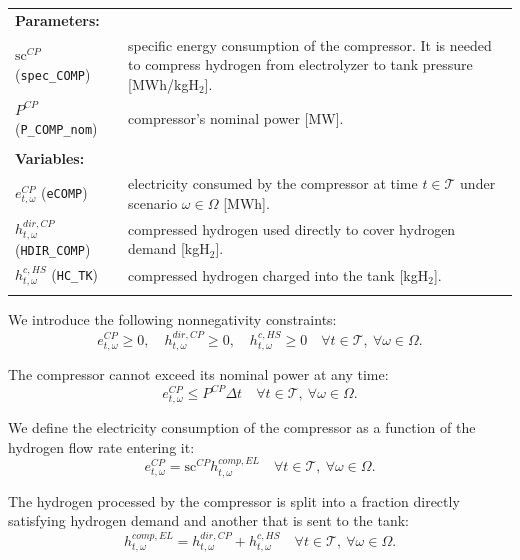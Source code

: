 \documentclass{article}
\begin{document}
\noindent
\begin{tabularx}{\textwidth}{@{}l X@{}}
    \textbf{Parameters:} \\
    $\text{sc}^{CP}$ (\verb|spec_COMP|)
      & specific energy consumption of the compressor. It is needed to compress
        hydrogen from electrolyzer to tank pressure [MWh/kgH$_2$]. \\
    $P^{CP}$ (\verb|P_COMP_nom|)
      & compressor's nominal power [MW]. \\
    \\

    \textbf{Variables:} \\
    $e^{CP}_{t,\omega}$ (\verb|eCOMP|)
      & electricity consumed by the compressor at time $t \in \mathcal{T}$
        under scenario $\omega \in \Omega$ [MWh]. \\
    $h^{dir,CP}_{t,\omega}$ (\verb|HDIR_COMP|)
      & compressed hydrogen used directly to cover hydrogen demand [kgH$_2$]. \\
    $h^{c,HS}_{t,\omega}$ (\verb|HC_TK|)
      & compressed hydrogen charged into the tank [kgH$_2$]. \\
    \\
\end{tabularx}

We introduce the following nonnegativity constraints:
\begin{equation} \label{EQ:CP_nonnegativity}
    e^{CP}_{t, \omega} \geq 0, \quad h^{dir,CP}_{t, \omega} \geq 0, \quad h^{c,HS}_{t, \omega} \geq 0 \quad \forall t \in \mathcal{T}, \ \forall \omega \in \Omega.
\end{equation}

The compressor cannot exceed its nominal power at any time:
\begin{equation} \label{EQ:CP_power}
    e^{CP}_{t, \omega} \leq P^{CP} \Delta t \quad \forall t \in \mathcal{T}, \ \forall \omega \in \Omega.
\end{equation}

We define the electricity consumption of the compressor as a function of the hydrogen flow rate entering it:
\begin{equation} \label{EQ:CP_energy}
    e^{CP}_{t, \omega} = \text{sc}^{CP}  h^{comp,EL}_{t, \omega} \quad \forall t \in \mathcal{T}, \ \forall \omega \in \Omega.
\end{equation}

The hydrogen processed by the compressor is split into a fraction directly satisfying hydrogen demand and another that is sent to the tank:
\begin{equation} \label{EQ:CP_split}
    h^{comp,EL}_{t, \omega} = h^{dir,CP}_{t, \omega} + h^{c,HS}_{t, \omega} \quad \forall t \in \mathcal{T}, \ \forall \omega \in \Omega.
\end{equation}
\end{document}
